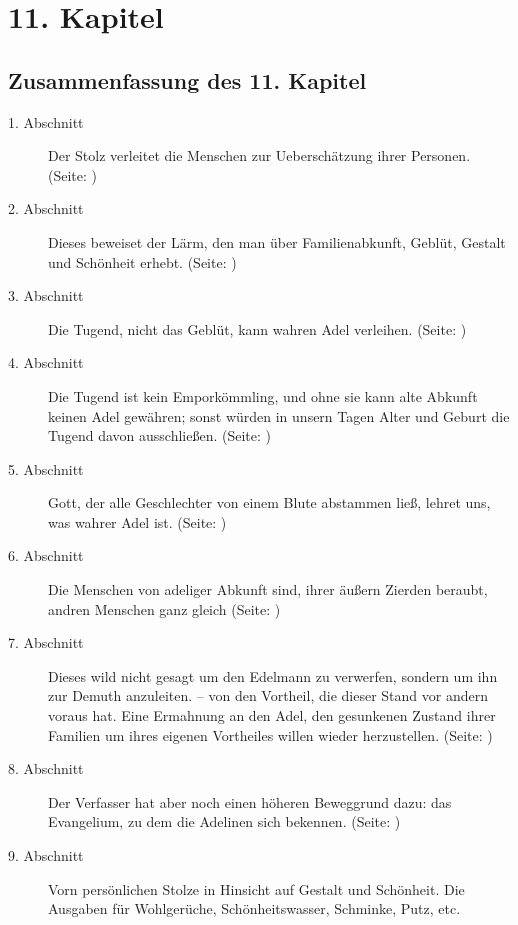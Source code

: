 

\chapter{11. Kapitel} \label{kap11}
\section{Zusammenfassung des 11. Kapitel}
\small
\begin{description}
\item[1. Abschnitt] Der Stolz verleitet die Menschen zur Ueberschätzung ihrer
Personen. (Seite: \pageref{kap11_ab1})
\item[2. Abschnitt] Dieses beweiset der Lärm, den man über Familienabkunft,
Geblüt, Gestalt und Schönheit erhebt. (Seite: \pageref{kap11_ab2})
\item[3. Abschnitt] Die Tugend, nicht das Geblüt, kann wahren Adel verleihen. (Seite: \pageref{kap11_ab3})
\item[4. Abschnitt] Die Tugend ist kein Emporkömmling, und ohne sie kann alte
Abkunft keinen Adel gewähren; sonst würden in unsern Tagen Alter und Geburt die
Tugend davon ausschließen. (Seite: \pageref{kap11_ab4})
\item[5. Abschnitt] Gott, der alle Geschlechter von einem Blute abstammen ließ,
lehret uns, was wahrer Adel ist. (Seite: \pageref{kap11_ab5})
\item[6. Abschnitt] Die Menschen von adeliger Abkunft sind, ihrer äußern Zierden
beraubt, andren Menschen ganz gleich (Seite: \pageref{kap11_ab6})
\item[7. Abschnitt] Dieses wild nicht gesagt um den Edelmann zu verwerfen,
sondern um ihn zur Demuth anzuleiten. – von den Vortheil, die dieser Stand vor
andern voraus hat. Eine Ermahnung an den Adel, den gesunkenen Zustand ihrer
Familien um ihres eigenen Vortheiles willen wieder herzustellen. (Seite: \pageref{kap11_ab7})
\item[8. Abschnitt] Der Verfasser hat aber noch einen höheren Beweggrund dazu:
das Evangelium, zu dem die Adelinen sich bekennen. (Seite: \pageref{kap11_ab8})
\item[9. Abschnitt] Vorn persönlichen Stolze in Hinsicht auf Gestalt und
Schönheit. Die Ausgaben für Wohlgerüche, Schönheitswasser, Schminke, Putz, etc.

\end{description}
